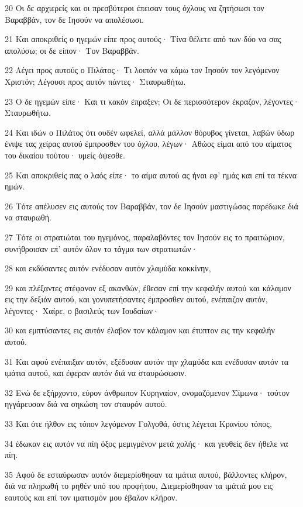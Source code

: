 \par 20 Οι δε αρχιερείς και οι πρεσβύτεροι έπεισαν τους όχλους να ζητήσωσι τον Βαραββάν, τον δε Ιησούν να απολέσωσι.
\par 21 Και αποκριθείς ο ηγεμών είπε προς αυτούς· Τίνα θέλετε από των δύο να σας απολύσω; οι δε είπον· Τον Βαραββάν.
\par 22 Λέγει προς αυτούς ο Πιλάτος· Τι λοιπόν να κάμω τον Ιησούν τον λεγόμενον Χριστόν; Λέγουσι προς αυτόν πάντες· Σταυρωθήτω.
\par 23 Ο δε ηγεμών είπε· Και τι κακόν έπραξεν; Οι δε περισσότερον έκραζον, λέγοντες· Σταυρωθήτω.
\par 24 Και ιδών ο Πιλάτος ότι ουδέν ωφελεί, αλλά μάλλον θόρυβος γίνεται, λαβών ύδωρ ένιψε τας χείρας αυτού έμπροσθεν του όχλου, λέγων· Αθώος είμαι από του αίματος του δικαίου τούτου· υμείς όψεσθε.
\par 25 Και αποκριθείς πας ο λαός είπε· το αίμα αυτού ας ήναι εφ' ημάς και επί τα τέκνα ημών.
\par 26 Τότε απέλυσεν εις αυτούς τον Βαραββάν, τον δε Ιησούν μαστιγώσας παρέδωκε διά να σταυρωθή.
\par 27 Τότε οι στρατιώται του ηγεμόνος, παραλαβόντες τον Ιησούν εις το πραιτώριον, συνήθροισαν επ' αυτόν όλον το τάγμα των στρατιωτών·
\par 28 και εκδύσαντες αυτόν ενέδυσαν αυτόν χλαμύδα κοκκίνην,
\par 29 και πλέξαντες στέφανον εξ ακανθών, έθεσαν επί την κεφαλήν αυτού και κάλαμον εις την δεξιάν αυτού, και γονυπετήσαντες έμπροσθεν αυτού, ενέπαιζον αυτόν, λέγοντες· Χαίρε, ο βασιλεύς των Ιουδαίων·
\par 30 και εμπτύσαντες εις αυτόν έλαβον τον κάλαμον και έτυπτον εις την κεφαλήν αυτού.
\par 31 Και αφού ενέπαιξαν αυτόν, εξέδυσαν αυτόν την χλαμύδα και ενέδυσαν αυτόν τα ιμάτια αυτού, και έφεραν αυτόν διά να σταυρώσωσιν.
\par 32 Ενώ δε εξήρχοντο, εύρον άνθρωπον Κυρηναίον, ονομαζόμενον Σίμωνα· τούτον ηγγάρευσαν διά να σηκώση τον σταυρόν αυτού.
\par 33 Και ότε ήλθον εις τόπον λεγόμενον Γολγοθά, όστις λέγεται Κρανίου τόπος,
\par 34 έδωκαν εις αυτόν να πίη όξος μεμιγμένον μετά χολής· και γευθείς δεν ήθελε να πίη.
\par 35 Αφού δε εσταύρωσαν αυτόν διεμερίσθησαν τα ιμάτια αυτού, βάλλοντες κλήρον, διά να πληρωθή το ρηθέν υπό του προφήτου, Διεμερίσθησαν τα ιμάτιά μου εις εαυτούς και επί τον ιματισμόν μου έβαλον κλήρον.
